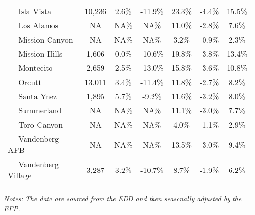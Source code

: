\documentclass[12pt]{article}
\begin{document}
\begin{landscape}
\begin{table}
\begin{tabular}{|l|c|c|c||c|c|c|}
$\quad$ Isla Vista & 10,236 & 2.6\% & -11.9\% & 23.3\% & -4.4\% & 15.5\% \\
$\quad$ Los Alamos & NA & NA\% & NA\% & 11.0\% & -2.8\% & 7.6\% \\
$\quad$ Mission Canyon & NA & NA\% & NA\% & 3.2\% & -0.9\% & 2.3\% \\
$\quad$ Mission Hills & 1,606 & 0.0\% & -10.6\% & 19.8\% & -3.8\% & 13.4\% \\
$\quad$ Montecito & 2,659 & 2.5\% & -13.0\% & 15.8\% & -3.6\% & 10.8\% \\
$\quad$ Orcutt & 13,011 & 3.4\% & -11.4\% & 11.8\% & -2.7\% & 8.2\% \\
$\quad$ Santa Ynez & 1,895 & 5.7\% & -9.2\% & 11.6\% & -3.2\% & 8.0\% \\
$\quad$ Summerland & NA & NA\% & NA\% & 11.1\% & -3.0\% & 7.7\% \\
$\quad$ Toro Canyon & NA & NA\% & NA\% & 4.0\% & -1.1\% & 2.9\% \\
$\quad$ Vandenberg AFB & NA & NA\% & NA\% & 13.5\% & -3.0\% & 9.4\% \\
$\quad$ Vandenberg Village & 3,287 & 3.2\% & -10.7\% & 8.7\% & -1.9\% & 6.2\% \\
&&&&&& \\ \hline \hline
\end{tabular}
\par
\vspace{.5em}
\footnotesize
\textit{Notes: The data are sourced from the EDD and then seasonally adjusted by the EFP.}
\end{table}
\end{landscape}
\end{document}

